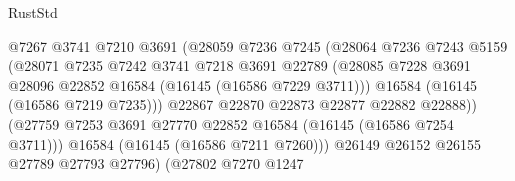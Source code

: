 \begin{lexlean}{RustStd}
\begin{coremodule}
                                        @7267
                                        @3741
                                        @7210
                                        @3691
                                        (@28059
                                          @7236
                                          @7245
                                          (@28064
                                            @7236
                                            @7243
                                            @5159
                                            (@28071
                                              @7235
                                              @7242
                                              @3741
                                              @7218
                                              @3691
                                              @22789
                                              (@28085
                                                @7228
                                                @3691
                                                @28096
                                                @22852
                                                @16584
                                                (@16145 (@16586 @7229 @3711)))
                                              @16584
                                              (@16145 (@16586 @7219 @7235)))
                                            @22867
                                            @22870
                                            @22873
                                            @22877
                                            @22882
                                            @22888))
                                        (@27759
                                          @7253
                                          @3691
                                          @27770
                                          @22852
                                          @16584
                                          (@16145 (@16586 @7254 @3711)))
                                        @16584
                                        (@16145 (@16586 @7211 @7260)))
                                      @26149
                                      @26152
                                      @26155
                                      @27789
                                      @27793
                                      @27796)
                                    (@27802
                                      @7270
                                      @1247

\end{coremodule}
\end{lexlean}
